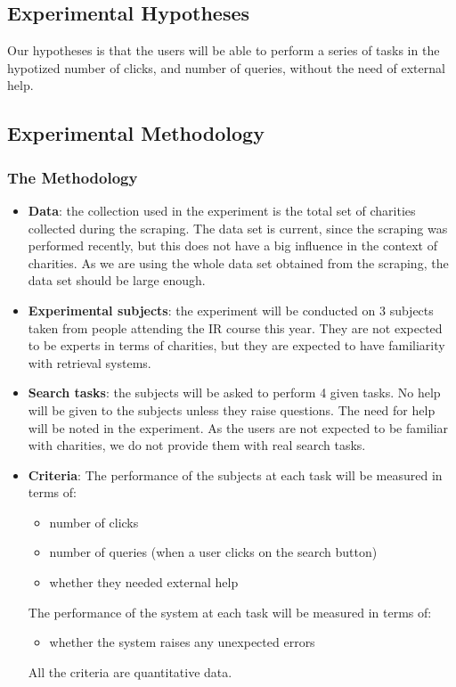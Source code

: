 \documentclass[unicode,9pt,a4paper,oneside,numbers=endperiod,openany]{scrartcl}
\begin{document}
\subsection{Experimental Hypotheses}

Our hypotheses is that the users will be able to perform a series of tasks in the hypotized number of clicks, and number of queries, without the need of external help.

\subsection{Experimental Methodology}

\subsubsection{The Methodology}

\begin{itemize}
    \item \textbf{Data}: the collection used in the experiment is the total set of charities collected during the scraping.
          The data set is current, since the scraping was performed recently, but this does not have a big influence in the context of charities.
          As we are using the whole data set obtained from the scraping, the data set should be large enough.
    \item \textbf{Experimental subjects}: the experiment will be conducted on 3 subjects taken from people attending the IR course this year. They are not expected to be experts in terms of charities, but they are expected to have familiarity with retrieval systems.
    \item \textbf{Search tasks}: the subjects will be asked to perform 4 given tasks. No help will be given to the subjects unless they raise questions. The need for help will be noted in the experiment. As the users are not expected to be familiar with charities, we do not provide them with real search tasks.
    \item \textbf{Criteria}: The performance of the subjects at each task will be measured in terms of:
          \begin{itemize}
              \item number of clicks
              \item number of queries (when a user clicks on the search button)
              \item whether they needed external help
          \end{itemize}
          The performance of the system at each task will be measured in terms of:
          \begin{itemize}
              \item whether the system raises any unexpected errors
          \end{itemize}
          All the criteria are quantitative data.
\end{itemize}
\end{document}
